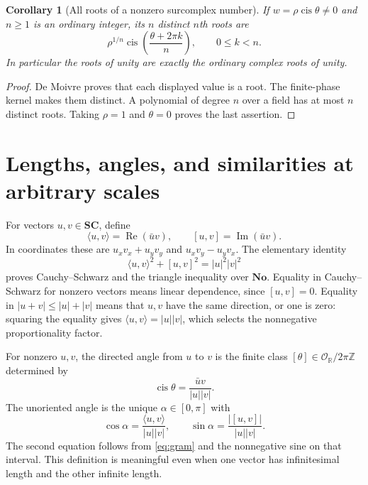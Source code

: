\documentclass[11pt,letterpaper]{article}
\newtheorem{corollary}[theorem]{Corollary}
\theoremstyle{definition}
\theoremstyle{remark}
\newcommand{\No}{\mathbf{No}}
\newcommand{\SC}{\mathbf{SC}}
\newcommand{\R}{\mathbb R}\newcommand{\C}{\mathbb C}
\newcommand{\Z}{\mathbb Z}\newcommand{\N}{\mathbb N}
\newcommand{\OO}{\mathcal O}\newcommand{\mm}{\mathfrak m}
\newcommand{\cis}{\operatorname{cis}}
\newcommand{\re}{\operatorname{Re}}\newcommand{\im}{\operatorname{Im}}
\numberwithin{equation}{section}
\begin{document}
\begin{corollary}[All roots of a nonzero surcomplex number]\label{cor:roots}
If $w=\rho\cis\theta\ne0$ and $n\ge1$ is an ordinary integer, its $n$ distinct $n$th roots are
\[
 \rho^{1/n}\cis\left(\frac{\theta+2\pi k}{n}\right),\qquad 0\le k<n.
\]
In particular the roots of unity are exactly the ordinary complex roots of unity.
\end{corollary}
\begin{proof}
De Moivre proves that each displayed value is a root. The finite-phase kernel makes them distinct. A polynomial of degree $n$ over a field has at most $n$ distinct roots. Taking $\rho=1$ and $\theta=0$ proves the last assertion.
\end{proof}

\section{Lengths, angles, and similarities at arbitrary scales}\label{sec:metric}
For vectors $u,v\in\SC$, define
\[
 \langle u,v\rangle=\re(\bar u v),\qquad
 [u,v]=\im(\bar u v).
\]
In coordinates these are $u_xv_x+u_yv_y$ and $u_xv_y-u_yv_x$. The elementary identity
\begin{equation}\label{eq:gram}
 \langle u,v\rangle^2+[u,v]^2=|u|^2|v|^2
\end{equation}
proves Cauchy--Schwarz and the triangle inequality over $\No$. Equality in Cauchy--Schwarz for nonzero vectors means linear dependence, since $[u,v]=0$. Equality in $|u+v|\le|u|+|v|$ means that $u,v$ have the same direction, or one is zero: squaring the equality gives $\langle u,v\rangle=|u||v|$, which selects the nonnegative proportionality factor.

For nonzero $u,v$, the directed angle from $u$ to $v$ is the finite class $[\theta]\in\OO_{\R}/2\pi\Z$ determined by
\begin{equation}\label{eq:angleunit}
 \cis\theta=\frac{\bar u v}{|u||v|}.
\end{equation}
The unoriented angle is the unique $\alpha\in[0,\pi]$ with
\[
 \cos\alpha=\frac{\langle u,v\rangle}{|u||v|},\qquad
 \sin\alpha=\frac{|[u,v]|}{|u||v|}.
\]
The second equation follows from \eqref{eq:gram} and the nonnegative sine on that interval. This definition is meaningful even when one vector has infinitesimal length and the other infinite length.
\end{document}

